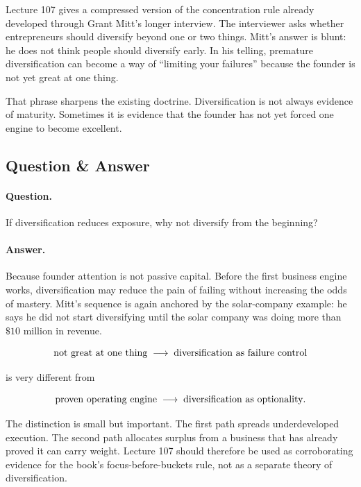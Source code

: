 \documentclass[11pt,oneside]{book}
\begin{document}
Lecture 107 gives a compressed version of the concentration rule already developed through Grant Mitt's longer interview. The interviewer asks whether entrepreneurs should diversify beyond one or two things. Mitt's answer is blunt: he does not think people should diversify early. In his telling, premature diversification can become a way of ``limiting your failures'' because the founder is not yet great at one thing.

That phrase sharpens the existing doctrine. Diversification is not always evidence of maturity. Sometimes it is evidence that the founder has not yet forced one engine to become excellent.

\subsection{Question \& Answer}

\paragraph{Question.}
If diversification reduces exposure, why not diversify from the beginning?

\paragraph{Answer.}
Because founder attention is not passive capital. Before the first business engine works, diversification may reduce the pain of failing without increasing the odds of mastery. Mitt's sequence is again anchored by the solar-company example: he says he did not start diversifying until the solar company was doing more than \(\$10\) million in revenue.

\[
\hbox{not great at one thing}
\;\longrightarrow\;
\hbox{diversification as failure control}
\]

is very different from

\[
\hbox{proven operating engine}
\;\longrightarrow\;
\hbox{diversification as optionality}.
\]

The distinction is small but important. The first path spreads underdeveloped execution. The second path allocates surplus from a business that has already proved it can carry weight. Lecture 107 should therefore be used as corroborating evidence for the book's focus-before-buckets rule, not as a separate theory of diversification.

\end{document}
